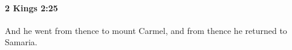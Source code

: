 
		\paragraph{2 Kings 2:25} %
			\label{2KINGS-2-25}

			And he went from thence to mount Carmel, and from thence he returned to Samaria.

